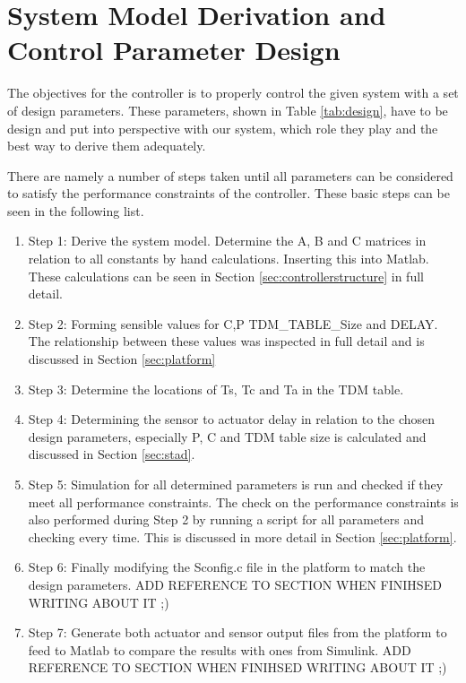 \section{System Model Derivation and Control Parameter Design}
The objectives for the controller is to properly control the given system with a set of design parameters. These parameters, shown in Table \ref{tab:design}, have to be design and put into perspective with our system, which role they play and the best way to derive them adequately.

There are namely a number of steps taken until all parameters can be considered to satisfy the performance constraints of the controller. These basic steps can be seen in the following list.

\begin{enumerate}
	\item Step 1: Derive the system model. Determine the A, B and C matrices in relation to all constants by hand calculations. Inserting this into Matlab. These calculations can be seen in Section \ref{sec:controllerstructure} in full detail.
	\item Step 2: Forming sensible values for C,P TDM\_TABLE\_Size and DELAY. The relationship between these values was inspected in full detail and is discussed in Section \ref{sec:platform}
	\item Step 3: Determine the locations of Ts, Tc and Ta in the TDM table.
	\item Step 4: Determining the sensor to actuator delay in relation to the chosen design parameters, especially P, C and TDM table size is calculated and discussed in Section \ref{sec:stad}. 
	\item Step 5: Simulation for all determined parameters is run and checked if they meet all performance constraints. The check on the performance constraints is also performed during Step 2 by running a script for all parameters and checking every time. This is discussed in more detail in Section \ref{sec:platform}.
	\item Step 6: Finally modifying the Sconfig.c file in the platform to match the design parameters.\color{red} ADD REFERENCE TO SECTION WHEN FINIHSED WRITING ABOUT IT ;) \color{black}
	\item Step 7: Generate both actuator and sensor output files from the platform to feed to Matlab to compare the results with ones from Simulink.\color{red} ADD REFERENCE TO SECTION WHEN FINIHSED WRITING ABOUT IT ;) \color{black}
\end{enumerate}


